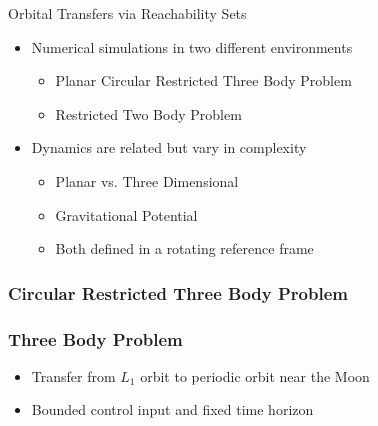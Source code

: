 \begin{frame}[t]{Orbital Transfers via Reachability Sets}
    \begin{itemize}
        \item Numerical simulations in two different environments
        \begin{itemize}
            \item Planar Circular Restricted Three Body Problem
            \item Restricted Two Body Problem 
        \end{itemize}
        \pause
        \item Dynamics are related but vary in complexity
        \begin{itemize}
            \item Planar vs. Three Dimensional
            \item Gravitational Potential
            \item Both defined in a rotating reference frame
        \end{itemize}
    \end{itemize}
\end{frame}

\subsubsection[CRTBP]{Circular Restricted Three Body Problem}

\begin{frame}%
\frametitle{Three Body Problem}
    \begin{itemize}
        \item Transfer from \( L_1 \) orbit to periodic orbit near the Moon
        \item Bounded control input and fixed time horizon
    \end{itemize}
    
\end{frame} %

